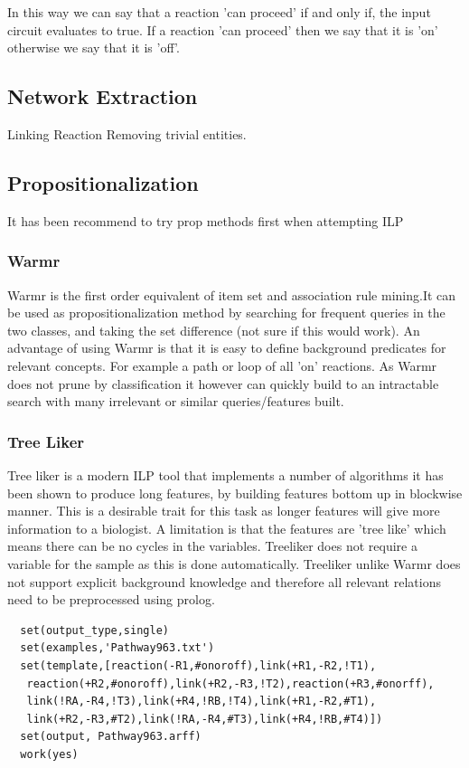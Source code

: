 \documentclass[runningheads,a4paper]{llncs}
\begin{document}
In this way we can say that a reaction 'can proceed' if and only if, the input circuit evaluates to true. If a reaction 'can proceed' then we say that it is 'on' otherwise we say that it is 'off'. 
\subsection{Network Extraction}
Linking Reaction Removing trivial entities.
\subsection{Propositionalization}
It has been recommend to try prop methods first when attempting ILP
\subsubsection{Warmr}
Warmr is the first order equivalent of item set and association rule mining.It can be used as propositionalization method by searching for frequent queries in the two classes, and taking the set difference (not sure if this would work). An advantage of using Warmr is that it is easy to define background predicates for relevant concepts. For example a path or loop of all 'on' reactions. As Warmr does not prune by classification it however can quickly build to an intractable search with many irrelevant or similar queries/features built. 
	     
\subsubsection{Tree Liker}
Tree liker is a modern ILP tool that implements a number of algorithms it has been shown to produce long features, by building features bottom up in blockwise manner. This is a desirable trait for  this task as longer features will give more information to a biologist. A limitation is that the features are 'tree like' which means there can be no cycles in the variables. 
Treeliker does not require a variable for the sample as this is done automatically. Treeliker unlike Warmr does not support explicit background knowledge and therefore all relevant relations need to be preprocessed using prolog.
 
\noindent
\begin{verbatim}
  set(output_type,single)
  set(examples,'Pathway963.txt')
  set(template,[reaction(-R1,#onoroff),link(+R1,-R2,!T1),
   reaction(+R2,#onoroff),link(+R2,-R3,!T2),reaction(+R3,#onorff),
   link(!RA,-R4,!T3),link(+R4,!RB,!T4),link(+R1,-R2,#T1),
   link(+R2,-R3,#T2),link(!RA,-R4,#T3),link(+R4,!RB,#T4)])
  set(output, Pathway963.arff)
  work(yes)
\end{verbatim}
\end{document}
